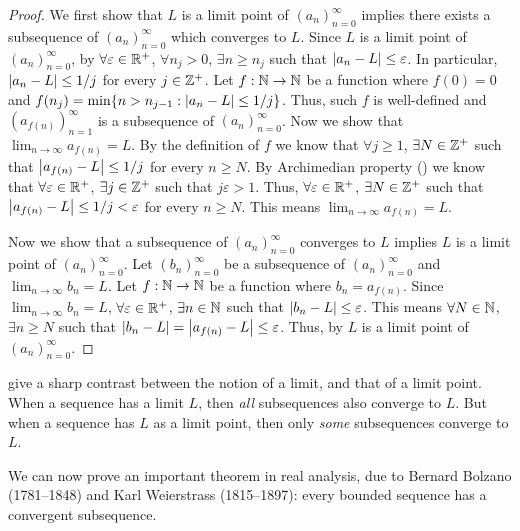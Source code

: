 \begin{proof}
  We first show that \(L\) is a limit point of \((a_n)_{n = 0}^\infty\) implies there exists a subsequence of \((a_n)_{n = 0}^\infty\) which converges to \(L\).
  Since \(L\) is a limit point of \((a_n)_{n = 0}^\infty\), by  \(\forall \varepsilon \in \mathbb{R}^+\), \(\forall n_j > 0\), \(\exists n \geq n_j\) such that \(\left\lvert a_n - L\right\rvert \leq \varepsilon\).
  In particular, \(\left\lvert a_n - L\right\rvert \leq 1 / j\) for every \(j \in \mathbb{Z}^+\).
  Let \(f : \mathbb{N} \to \mathbb{N}\) be a function where \(f(0) = 0\) and \(f(n_j) = \min\set{n > n_{j - 1} : \abs{a_n - L} \leq 1 / j}\).
  Thus, such \(f\) is well-defined and \((a_{f(n)})_{n = 1}^\infty\) is a subsequence of \((a_n)_{n = 0}^\infty\).
  Now we show that \(\lim_{n \to \infty} a_{f(n)} = L\).
  By the definition of \(f\) we know that \(\forall j \geq 1\), \(\exists N \in \mathbb{Z}^+\) such that \(\left\lvert a_{f(n)} - L\right\rvert \leq 1 / j\) for every \(n \geq N\).
  By Archimedian property () we know that \(\forall \varepsilon \in \mathbb{R}^+\), \(\exists j \in \mathbb{Z}^+\) such that \(j \varepsilon > 1\).
  Thus, \(\forall \varepsilon \in \mathbb{R}^+\), \(\exists N \in \mathbb{Z}^+\) such that \(\left\lvert a_{f(n)} - L\right\rvert \leq 1 / j < \varepsilon\) for every \(n \geq N\).
  This means \(\lim_{n \to \infty} a_{f(n)} = L\).

  Now we show that a subsequence of \((a_n)_{n = 0}^\infty\) converges to \(L\) implies \(L\) is a limit point of \((a_n)_{n = 0}^\infty\).
  Let \((b_n)_{n = 0}^\infty\) be a subsequence of \((a_n)_{n = 0}^\infty\) and \(\lim_{n \to \infty} b_n = L\).
  Let \(f : \mathbb{N} \to \mathbb{N}\) be a function where \(b_n = a_{f(n)}\).
  Since \(\lim_{n \to \infty} b_n = L\), \(\forall \varepsilon \in \mathbb{R}^+\), \(\exists n \in \mathbb{N}\) such that \(\left\lvert b_n - L\right\rvert \leq \varepsilon\).
  This means \(\forall N \in \mathbb{N}\), \(\exists n \geq N\) such that \(\left\lvert b_n - L\right\rvert = \left\lvert a_{f(n)} - L\right\rvert \leq \varepsilon\).
  Thus, by  \(L\) is a limit point of \((a_n)_{n = 0}^\infty\).
\end{proof}

\begin{rmk}\label{i:6.6.7}
   give a sharp contrast between the notion of a limit, and that of a limit point.
  When a sequence has a limit \(L\), then \emph{all} subsequences also converge to \(L\).
  But when a sequence has \(L\) as a limit point, then only \emph{some} subsequences converge to \(L\).
\end{rmk}

\begin{note}
  We can now prove an important theorem in real analysis, due to Bernard Bolzano (1781--1848) and Karl Weierstrass (1815--1897):
  every bounded sequence has a convergent subsequence.
\end{note}

